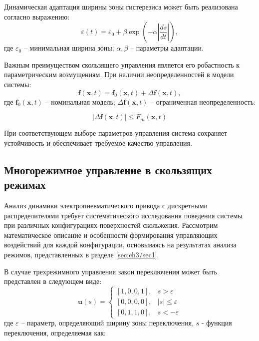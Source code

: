 Динамическая адаптация ширины зоны гистерезиса может быть реализована согласно выражению:
\begin{equation*}
	\varepsilon(t) = \varepsilon_0 + \beta\exp\left(-\alpha\left|\frac{ds}{dt}\right|\right),
\end{equation*}
где $\varepsilon_0$ -- минимальная ширина зоны; $\alpha, \beta$ -- параметры адаптации.

Важным преимуществом скользящего управления является его робастность к
параметрическим возмущениям. При наличии неопределенностей в модели системы:
\begin{equation*}
	\mathbf{f}(\mathbf{x}, t) = \mathbf{f}_0(\mathbf{x}, t) + \Delta\mathbf{f}(\mathbf{x}, t),
\end{equation*}
где $\mathbf{f}_0(\mathbf{x}, t)$ -- номинальная модель;
$\Delta\mathbf{f}(\mathbf{x}, t)$ -- ограниченная неопределенность:

\begin{equation*}
	|\Delta\mathbf{f}(\mathbf{x}, t)| \leq F_m(\mathbf{x}, t)
\end{equation*}

При соответствующем выборе параметров управления система сохраняет устойчивость и обеспечивает требуемое качество управления.

\subsection{Многорежимное управление в скользящих режимах}\label{subsec:ch3/sec3/sub2}

Анализ динамики электропневматического привода с дискретными распределителями требует
систематического исследования поведения системы при различных конфигурациях поверхностей
скольжения. Рассмотрим математическое описание и особенности формирования управляющих
воздействий для каждой конфигурации, основываясь на результатах анализа режимов, представленных в разделе \ref{sec:ch3/sec1}.

В случае трехрежимного управления закон переключения может быть представлен в следующем виде:
\begin{equation}
	\mathbf{u}(s) = \begin{cases}
		[1,0,0,1], & s > \varepsilon      \\
		[0,0,0,0], & |s| \leq \varepsilon \\
		[0,1,1,0], & s < -\varepsilon
	\end{cases}
\end{equation}
где $\varepsilon$ -- параметр, определяющий ширину зоны переключения, $s$ - функция переключения, определяемая как:

